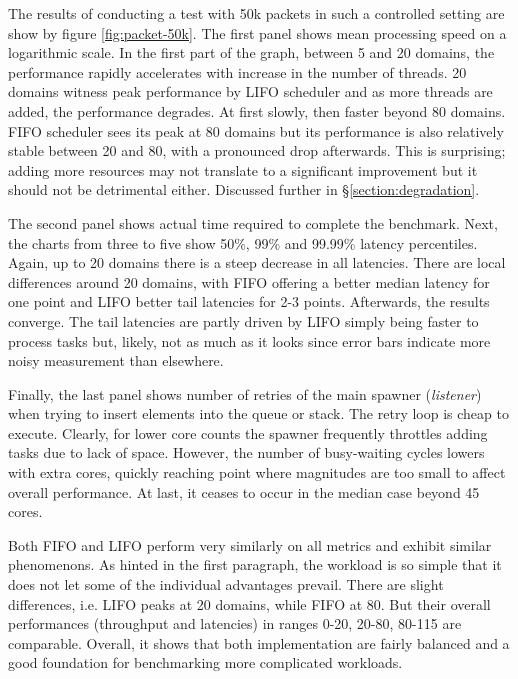 \documentclass[12pt,a4paper,twoside]{report}
\begin{document}
The results of conducting a test with 50k packets in such a controlled setting are show by figure \ref{fig:packet-50k}. The first panel shows mean processing speed on a logarithmic scale. In the first part of the graph, between 5 and 20 domains, the performance rapidly accelerates with increase in the number of threads. 20 domains witness peak performance by LIFO scheduler and as more threads are added, the performance degrades. At first slowly, then faster beyond 80 domains. FIFO scheduler sees its peak at 80 domains but its performance is also relatively stable between 20 and 80, with a pronounced drop afterwards. This is surprising; adding more resources may not translate to a significant improvement \cite{amdahl} but it should not be detrimental either. Discussed further in \S\ref{section:degradation}. 

The second panel shows actual time required to complete the benchmark. Next, the charts from three to five show 50\%, 99\% and 99.99\% latency percentiles. Again, up to 20 domains there is a steep decrease in all latencies. There are local differences around 20 domains, with FIFO offering a better median latency for one point and LIFO better tail latencies for 2-3 points. Afterwards, the results converge. The tail latencies are partly driven by LIFO simply being faster to process tasks but, likely, not as much as it looks since error bars indicate more noisy measurement than elsewhere. 

Finally, the last panel shows number of retries of the main spawner (\textit{listener}) when trying to insert elements into the queue or stack. The retry loop is cheap to execute. Clearly, for lower core counts the spawner frequently throttles adding tasks due to lack of space. However, the number of busy-waiting cycles lowers with extra cores, quickly reaching point where magnitudes are too small to affect overall performance. At last, it ceases to occur in the median case beyond 45 cores. 
 
Both FIFO and LIFO perform very similarly on all metrics and exhibit similar phenomenons. As hinted in the first paragraph, the workload is so simple that it does not let some of the individual advantages prevail. There are slight differences, i.e. LIFO peaks at 20 domains, while FIFO at 80. But their overall performances (throughput and latencies) in ranges 0-20, 20-80, 80-115 are comparable.  Overall, it shows that both implementation are fairly balanced and a good foundation for benchmarking more complicated workloads.
\end{document}
